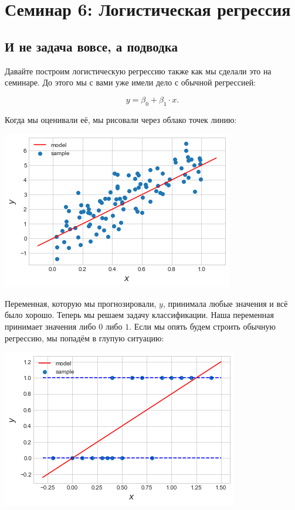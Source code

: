 \documentclass[12pt, a4paper, oneside]{article}
\begin{document}
	
\section*{Семинар 6: Логистическая регрессия}

\subsection*{И не задача вовсе, а подводка}

Давайте построим логистическую регрессию также как мы сделали это на семинаре.  До этого мы с вами уже имели дело с обычной регрессией: 

$$
y = \beta_0 + \beta_1 \cdot x.
$$

Когда мы оценивали её, мы рисовали через облако точек линию: 

\begin{center}
	\includegraphics[scale=0.7]{regr.png}
\end{center}

Переменная, которую мы прогнозировали, $y$, принимала любые значения и всё было хорошо. Теперь мы решаем задачу классификации. Наша переменная принимает значения либо $0$ либо $1$. Если мы опять будем строить обычную регрессию, мы попадём в глупую ситуацию: 

\begin{center}
	\includegraphics[scale=0.7]{logreg_problem.png}
\end{center}
\end{document}
